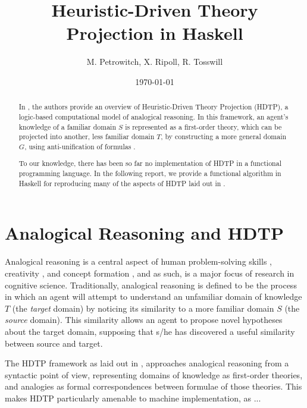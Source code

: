 \documentclass[12pt,a4paper]{article}
\title{Heuristic-Driven Theory Projection in Haskell}
\author{M. Petrowitch, X. Ripoll, R. Tosswill}
\date{\today}
\begin{document}
\maketitle

\begin{abstract}
In \cite{Schmidt-2014}, the authors provide an overview of Heuristic-Driven
Theory Projection (HDTP), a logic-based computational model of analogical
reasoning. In this framework, an agent's knowledge of a familiar domain $S$ is
represented as a first-order theory, which can be projected into another, less
familiar domain $T$, by constructing a more general domain $G$, using
anti-unification of formulas \cite{Plotkin70}. 

To our knowledge, there has been so far no implementation of HDTP in a functional programming language. In the following report, we provide a functional algorithm in Haskell for reproducing many of the aspects of HDTP laid out in \cite{Schmidt-2014}.
\end{abstract}

\vfill

\tableofcontents



\clearpage




\section{Analogical Reasoning and HDTP}
Analogical reasoning is a central aspect of human problem-solving skills
\cite{gentner}, creativity \cite{Besold2015GeneralizeAB}, and concept
formation \cite{hofstadter2013surfaces}, and as such, is a major focus of
research in cognitive science. Traditionally, analogical reasoning is defined to be the process in which an agent will attempt to understand an unfamiliar domain of knowledge $T$ (the \textit{target} domain) by noticing its similarity to a more familiar domain $S$ (the \textit{source} domain). This similarity allows an agent to propose novel hypotheses about the target domain, supposing that s/he has discovered a useful similarity between source and target.

The HDTP framework as laid out in \cite{Schmidt-2014}, approaches analogical reasoning from a syntactic point of view, representing domains of knowledge as first-order theories, and analogies as formal correspondences between formulae of those theories. This makes HDTP particularly amenable to machine implementation, as ... 
\end{document}
